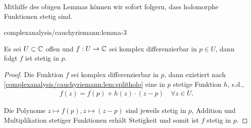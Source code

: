 \par
Mithilfe des obigen Lemmas können wir sofort folgern, dass holomorphe Funktionen stetig sind.
\begin{lemma}{}{complexanalysis/cauchyriemann:lemma-3}



\par
Es sei \(U\subset\mathbb{C}\) offen und \(f:U\to\mathbb{C}\) sei komplex differenzierbar in \(p\in U\), dann folgt \(f\) ist stetig in \(p\).
\end{lemma}

\begin{proof}
 Die Funktion \(f\) sei komplex differenzierbar in \(p\), dann existiert nach \cref{complexanalysis/cauchyriemann:lem:splitholo} eine in \(p\) stetige Funktion \(h\), s.d.,
\begin{align*}
f(z) = f(p) + h(z)\cdot(z-p)\quad \forall z\in U.
\end{align*}
\par
Die Polynome \(z\mapsto f(p), z\mapsto (z-p)\) sind jeweils stetig in \(p\), Addition und Multiplikation stetiger Funktionen erhält Stetigkeit und somit ist \(f\) stetig in \(p\).
\end{proof}

